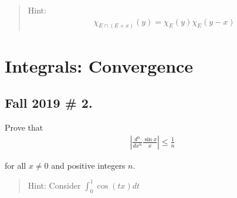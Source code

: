 \begin{quote}
Hint:
\begin{align*}
\chi_{E \cap(E+x)}(y)=\chi_{E}(y) \chi_{E}(y-x)
\end{align*}
\end{quote}

\hypertarget{integrals-convergence}{%
\section{Integrals: Convergence}\label{integrals-convergence}}

\hypertarget{fall-2019-2.}{%
\subsection{Fall 2019 \# 2.}\label{fall-2019-2.}}

Prove that
\begin{align*}
\left| \frac{d^{n}}{d x^{n}} \frac{\sin x}{x}\right| \leq \frac{1}{n}
\end{align*}

for all \(x \neq 0\) and positive integers \(n\).

\begin{quote}
Hint: Consider \(\displaystyle\int_0^1 \cos(tx) dt\)
\end{quote}

